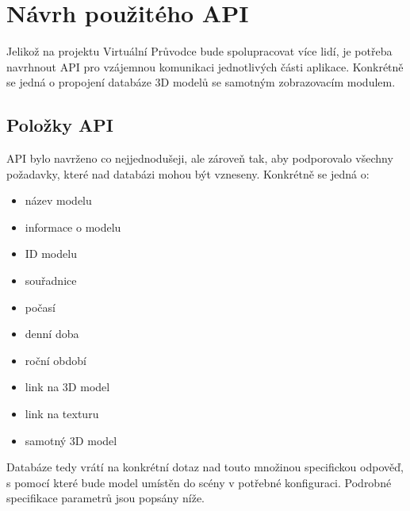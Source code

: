 \documentclass[thesis=B,czech]{FITthesis}[2012/06/26]
\begin{document}
	\section{Návrh použitého API}
	\label{sec:API}
    
    Jelikož na projektu Virtuální Průvodce bude spolupracovat více lidí, je potřeba navrhnout API pro vzájemnou komunikaci jednotlivých části aplikace. Konkrétně se jedná o propojení databáze 3D modelů se samotným zobrazovacím modulem.

    
      \subsection{Položky API}
      
      API bylo navrženo co nejjednodušeji, ale zároveň tak, aby  podporovalo všechny požadavky, které nad databázi mohou být vzneseny. Konkrétně se jedná o:

	\begin{itemize}
        \item název modelu 
        \item informace o modelu 
        \item ID modelu
        \item souřadnice 
        \item počasí
        \item denní doba
        \item roční období
        \item link na 3D model 
        \item link na texturu 
        \item samotný 3D model
    \end{itemize}

Databáze tedy vrátí na konkrétní dotaz nad touto množinou specifickou odpověď, s pomocí které bude model umístěn do scény v potřebné konfiguraci. Podrobné specifikace parametrů jsou popsány níže.
	
\end{document}
